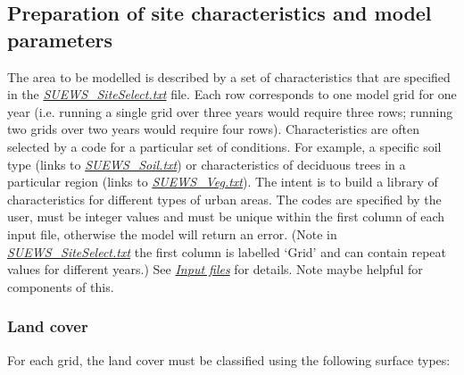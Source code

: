 \documentclass[letterpaper,10pt,english]{sphinxmanual}
\begin{document}
\subsection{Preparation of site characteristics and model parameters}
\label{\detokenize{prepare-to-run-the-model:preparation-of-site-characteristics-and-model-parameters}}
The area to be modelled is described by a set of characteristics that
are specified in the {\hyperref[\detokenize{prepare-to-run-the-model:SUEWS_SiteSelect.txt}]{\emph{SUEWS\_SiteSelect.txt}}}
file. Each row corresponds to one model grid for one year (i.e. running
a single grid over three years would require three rows; running two
grids over two years would require four rows). Characteristics are often
selected by a code for a particular set of conditions. For example, a
specific soil type (links to {\hyperref[\detokenize{prepare-to-run-the-model:SUEWS_Soil.txt}]{\emph{SUEWS\_Soil.txt}}}) or
characteristics of deciduous trees in a particular region (links to
{\hyperref[\detokenize{prepare-to-run-the-model:SUEWS_Veg.txt}]{\emph{SUEWS\_Veg.txt}}}). The intent is to build a library of
characteristics for different types of urban areas. The codes are
specified by the user, must be integer values and must be unique within
the first column of each input file, otherwise the model will return an
error. (Note in {\hyperref[\detokenize{prepare-to-run-the-model:SUEWS_SiteSelect.txt}]{\emph{SUEWS\_SiteSelect.txt}}} the
first column is labelled ‘Grid’ and can contain repeat values for
different years.) See {\hyperref[\detokenize{prepare-to-run-the-model:Input_files}]{\emph{Input files}}} for details. Note
 maybe helpful for
components of this.


\subsubsection{Land cover}
\label{\detokenize{prepare-to-run-the-model:land-cover}}
For each grid, the land cover must be classified using the following
surface types:
\end{document}
